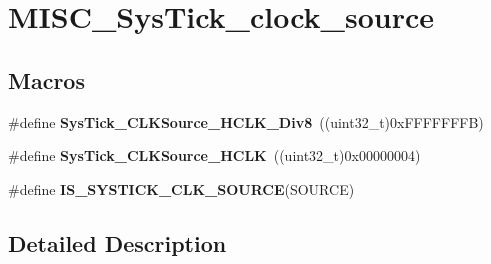 \hypertarget{group___m_i_s_c___sys_tick__clock__source}{\section{M\-I\-S\-C\-\_\-\-Sys\-Tick\-\_\-clock\-\_\-source}
\label{group___m_i_s_c___sys_tick__clock__source}
}
\subsection*{Macros}
\begin{DoxyCompactItemize}
\item 
\hypertarget{group___m_i_s_c___sys_tick__clock__source_ga545c387ce43db90f15faad5f354f890d}{\#define {\bfseries Sys\-Tick\-\_\-\-C\-L\-K\-Source\-\_\-\-H\-C\-L\-K\-\_\-\-Div8}~((uint32\-\_\-t)0x\-F\-F\-F\-F\-F\-F\-F\-B)}\label{group___m_i_s_c___sys_tick__clock__source_ga545c387ce43db90f15faad5f354f890d}

\item 
\hypertarget{group___m_i_s_c___sys_tick__clock__source_ga8a885ce2632ad4c35e229bb7c6e60191}{\#define {\bfseries Sys\-Tick\-\_\-\-C\-L\-K\-Source\-\_\-\-H\-C\-L\-K}~((uint32\-\_\-t)0x00000004)}\label{group___m_i_s_c___sys_tick__clock__source_ga8a885ce2632ad4c35e229bb7c6e60191}

\item 
\#define {\bfseries I\-S\-\_\-\-S\-Y\-S\-T\-I\-C\-K\-\_\-\-C\-L\-K\-\_\-\-S\-O\-U\-R\-C\-E}(S\-O\-U\-R\-C\-E)
\end{DoxyCompactItemize}


\subsection{Detailed Description}


